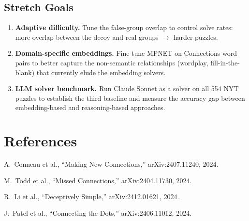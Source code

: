 \documentclass[11pt]{article}
\begin{document}
\subsection{Stretch Goals}

\begin{enumerate}[nosep, start=9]
    \item \textbf{Adaptive difficulty.}
          Tune the false-group overlap to control solve rates: more overlap
          between the decoy and real groups $\to$ harder puzzles.

    \item \textbf{Domain-specific embeddings.}
          Fine-tune MPNET on Connections word pairs to better capture the
          non-semantic relationships (wordplay, fill-in-the-blank) that
          currently elude the embedding solvers.

    \item \textbf{LLM solver benchmark.}
          Run Claude Sonnet as a solver on all 554 NYT puzzles to establish
          the third baseline and measure the accuracy gap between
          embedding-based and reasoning-based approaches.
\end{enumerate}

\section*{References}

\begin{enumerate}[nosep, label={[\arabic*]}]
    \item A.\ Conneau et al., ``Making New Connections,'' arXiv:2407.11240, 2024.
    \item M.\ Todd et al., ``Missed Connections,'' arXiv:2404.11730, 2024.
    \item R.\ Li et al., ``Deceptively Simple,'' arXiv:2412.01621, 2024.
    \item J.\ Patel et al., ``Connecting the Dots,'' arXiv:2406.11012, 2024.
\end{enumerate}
\end{document}
